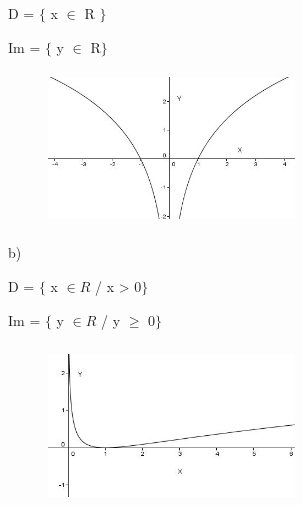 \documentclass[12pt]{article}
\begin{document}
D = $ \{ $  x $ \in $ R $ \} $ \par

Im = $ \{ $  y $ \in $ R$ \} $ \par




\begin{figure}[H]
	\begin{Center}
		\includegraphics[width=2.57in,height=1.6in]{./media/image34.JPG}
	\end{Center}
\end{figure}



\par

b)\par

D = $ \{ $  x  \(  \in R \)  / x > 0$ \} $ \par

\setlength{\parskip}{0.0pt}
Im = $ \{ $  y  \(  \in R \)  / y $ \geq $  0$ \} $ \par




\begin{figure}[H]
	\begin{Center}
		\includegraphics[width=2.57in,height=1.69in]{./media/image35.JPG}
	\end{Center}
\end{figure}
\end{document}
